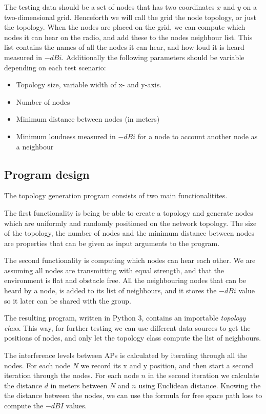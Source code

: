 \documentclass[a4paper,UKenglish]{report}
\begin{document}
The testing data should be a set of nodes that has two coordinates $x$ and $y$ on a two-dimensional grid. Henceforth we will call the grid 
the node topology, or just the topology. When the nodes are placed on the
grid, we can compute which nodes it can hear on the radio, and add these to the nodes neighbour list. This list contains the
names of all the nodes it can hear, and how loud it is heard measured in $-dBi$. Additionally
the following parameters should be variable depending on each test scenario:
\begin{itemize}
	\item Topology size, variable width of x- and y-axis.
	\item Number of nodes
	\item Minimum distance between nodes (in meters)
	\item Minimum loudness measured in $-dBi$ for a node to account another node as a neighbour
\end{itemize}

\subsection{Program design}
The topology generation program consists of two main functionalitites.

The first functionality is being  be able to create a topology and generate nodes which are uniformly
and randomly positioned on the network topology. The size of the topology, the number of nodes and the minimum distance
between nodes are properties that can be given as input arguments to the program. 

The second functionality is computing which nodes can hear each other. We are assuming all nodes
are transmitting with equal strength, and that the environment is flat and obstacle free. 
All the neighbouring nodes that can be heard by a node, is added to its list of neighbours, and it stores the $-dBi$ value so it later can be shared with
the group. 

The resulting program, written in Python 3\cite{Python3}, contains an importable \textit{topology class}. This way, for further testing we can use different data sources to get the positions of nodes,
and only let the topology class compute the list of neighbours. 

The interference levels between APs is calculated by iterating through all the nodes. For each node $N$ we record its x and y position,
and then start a second iteration through the nodes. For each node $n$ in the second iteration we calculate the distance $d$ in
meters between $N$ and $n$ using Euclidean distance. Knowing the the distance between the nodes,  we can use the formula for free space path loss \cite{FSPL} to compute the $-dBI$ values.
\end{document}

